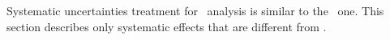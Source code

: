 Systematic uncertainties treatment for \ZZ\ analysis is similar to the
\WW\ one. This section describes only systematic effects that are
different from \WW{}.
